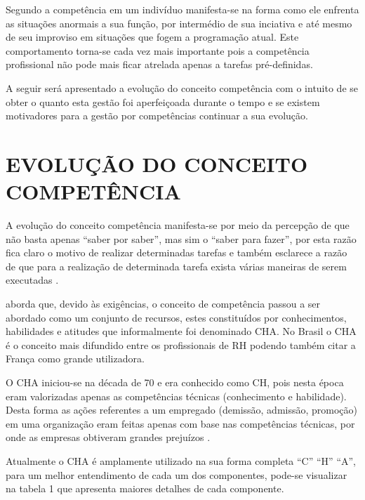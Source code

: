 Segundo  a competência em um indivíduo manifesta-se na forma como ele enfrenta as situações anormais a sua função, por intermédio de sua inciativa e até mesmo de seu improviso em situações que fogem a programação atual. Este comportamento torna-se cada vez mais importante pois a competência profissional não pode mais ficar atrelada apenas a tarefas pré-definidas.

A seguir será apresentado a evolução do conceito competência com o intuito de se obter o quanto esta gestão foi aperfeiçoada durante o tempo e se existem motivadores para a gestão por competências continuar a sua evolução.

\section{EVOLUÇÃO DO CONCEITO COMPETÊNCIA}

A evolução do conceito competência manifesta-se por meio da percepção de que não basta apenas “saber por saber”, mas sim o “saber para fazer”, por esta razão fica claro o motivo de realizar determinadas tarefas e também esclarece a razão de que para a realização de determinada tarefa exista várias maneiras de serem executadas \cite{schlatter2014administrador}.

 aborda que, devido às exigências, o conceito de competência passou a ser abordado como um conjunto de recursos, estes constituídos por conhecimentos, habilidades e atitudes que informalmente foi denominado CHA. No Brasil o CHA é o conceito mais difundido entre os profissionais de RH podendo também citar a França como grande utilizadora.

O CHA iniciou-se na década de 70 e era conhecido como CH, pois nesta época eram valorizadas apenas as competências técnicas (conhecimento e habilidade). Desta forma as ações referentes a um empregado (demissão, admissão, promoção) em uma organização eram feitas apenas com base nas competências técnicas, por onde as empresas obtiveram grandes prejuízos \cite{rabaglio2012gestao}.

Atualmente o CHA é amplamente utilizado na sua forma completa “C” “H” “A”, para um melhor entendimento de cada um dos componentes, pode-se visualizar na tabela 1 que apresenta maiores detalhes de cada componente.


